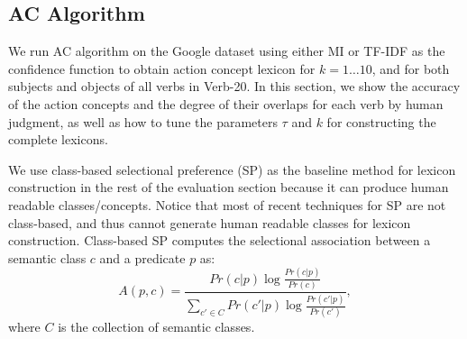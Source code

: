 \subsection{AC Algorithm}
\label{sec:accuracy}
We run AC algorithm on the Google dataset 
using either MI or TF-IDF as the confidence function to obtain
action concept lexicon for $k=1 \dots 10$,
and for both subjects and objects of all verbs in
Verb-20.
In this section, we show the accuracy of the action concepts
and the degree of their overlaps for each verb by human judgment,
as well as how to tune the parameters $\tau$ and $k$ for constructing
the complete lexicons.

We use class-based selectional preference (SP)\cite{resnik1996selectional}
as the baseline method for lexicon construction in the rest of
the evaluation section because it can
produce human readable classes/concepts.
Notice that most of recent techniques for SP are not class-based,
and thus cannot generate human readable classes for lexicon
construction.
Class-based SP computes the selectional association between a 
semantic class $c$ and a predicate $p$ as:
\begin{equation}
A(p,c)=\frac{Pr(c|p)\log\frac{Pr(c|p)}{Pr(c)}}
{\sum_{c'\in C}{Pr(c'|p)\log\frac{Pr(c'|p)}{Pr(c')}}},
\end{equation}
where $C$ is the collection of semantic classes.


